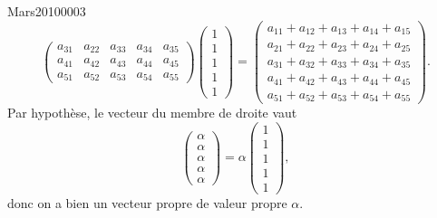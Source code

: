 \begin{corrige}{Mars20100003}
\begin{equation}
\begin{pmatrix}
			a_{31}	&	a_{22}	&	a_{33}	&	a_{34}	&	a_{35}\\	
			a_{41}	&	a_{42}	&	a_{43}	&	a_{44}	&	a_{45}\\	
			a_{51}	&	a_{52}	&	a_{53}	&	a_{54}	&	a_{55}
		\end{pmatrix}
		\begin{pmatrix}
			1	\\ 
			1	\\ 
			1	\\ 
			1	\\ 
			1	
		\end{pmatrix}
		=
		\begin{pmatrix}
			a_{11}+a_{12}+a_{13}+a_{14}+a_{15}	\\ 
			a_{21}+a_{22}+a_{23}+a_{24}+a_{25}	\\ 
			a_{31}+a_{32}+a_{33}+a_{34}+a_{35}	\\ 
			a_{41}+a_{42}+a_{43}+a_{44}+a_{45}	\\ 
			a_{51}+a_{52}+a_{53}+a_{54}+a_{55}
		\end{pmatrix}.
	\end{equation}
	Par hypothèse, le vecteur du membre de droite vaut
	\begin{equation}
		\begin{pmatrix}
			\alpha	\\ 
			\alpha	\\ 
			\alpha	\\ 
			\alpha	\\ 
			\alpha	
		\end{pmatrix}=
		\alpha\begin{pmatrix}
			1	\\ 
			1	\\ 
			1	\\ 
			1	\\ 
			1	
		\end{pmatrix},
	\end{equation}
	donc on a bien un vecteur propre de valeur propre $\alpha$.

\end{corrige}
